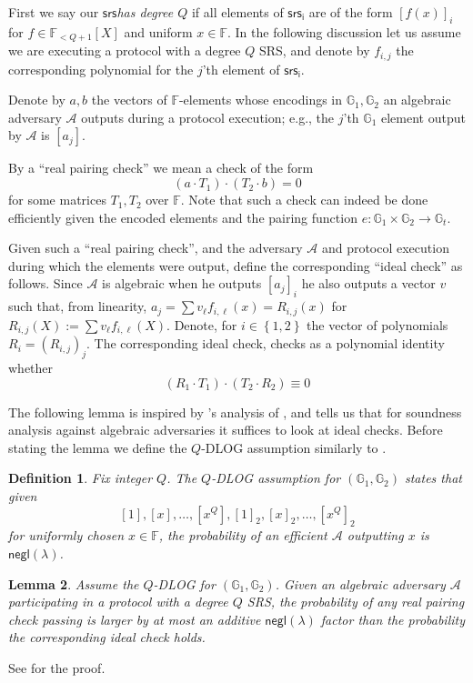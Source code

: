 \documentclass[11pt]{article} %
\newcommand{\G}{\ensuremath{{\mathbb G}}\xspace}
\newcommand{\Gt}{\ensuremath{{\mathbb G}_t}\xspace}
\newcommand{\F}{\ensuremath{\mathbb F}\xspace}
\newcommand{\adv}{\ensuremath{\mathcal A}\xspace}
\newcommand{\srs}{\ensuremath{\mathsf{srs}}\xspace}
\newcommand{\srsi}{\ensuremath{\mathsf{srs_i}}\xspace}
\newcommand{\negl}{\ensuremath{\mathsf{negl}(\lambda)}\xspace}
\newcommand{\defeq}{:=}
\newcommand{\enci}[1]{\ensuremath{\left[#1\right]_i}\xspace}
\newcommand{\enc}[1]{\ensuremath{\left[#1\right]}\xspace}
\newcommand{\enctwo}[1]{\ensuremath{\left[#1\right]_2}\xspace}
\newcommand{\set}[1]{\ensuremath{\left\{#1\right\}}\xspace}
\newcommand{\polysofdeg}[1]{\ensuremath{\F_{< #1}[X]}\xspace}
\newtheorem{lemma}{Lemma}[section]
\newtheorem{dfn}[lemma]{Definition}
\begin{document}
First we say our \srs \emph{has degree $Q$} if all elements of \srsi are of the form  \enci{f(x)} for $f\in \polysofdeg{Q+1}$ and uniform $x\in \F$. In the following discussion let us assume we are executing a protocol with a degree $Q$ SRS, and denote by $f_{i,j}$ the corresponding polynomial for the $j$'th element of \srsi.

Denote by $a,b$ the vectors of $\F$-elements whose encodings in $\G_1,\G_2$ an algebraic adversary \adv outputs during a protocol execution; e.g., the $j$'th $\G_1$ element output by \adv is \enc{a_j}.

By a ``real pairing check'' we mean a check of the form
\[(a\cdot T_1) \cdot (T_2\cdot b)=0\]
for some matrices $T_1,T_2$ over $\F$.
Note that such a check can indeed be done efficiently given the encoded elements and the pairing function $e:\G_1\times \G_2\to \Gt$.



Given such a ``real pairing check'', and the adversary \adv and protocol execution during which the elements were output, define the corresponding ``ideal check'' as follows.
Since \adv is algebraic when he outputs \enci{a_j} he also outputs a vector $v$ such that, from linearity, $a_j = \sum v_\ell f_{i,\ell}(x)=R_{i,j}(x)$ for $R_{i,j}(X) \defeq \sum v_\ell f_{i,\ell}(X)$.
Denote, for $i\in \set{1,2}$ the vector of polynomials $R_i=(R_{i,j})_j$.
The corresponding ideal check, checks as a polynomial identity whether
\[(R_1 \cdot T_1)\cdot (T_2\cdot R_2) \equiv 0\]


The following lemma is inspired by \cite{AGM}'s analysis of \cite{Groth16},
and tells us that for soundness analysis against algebraic adversaries it suffices to look at ideal checks.
Before stating the lemma we define the $Q$-DLOG assumption similarly to \cite{AGM}.
\begin{dfn}\label{ref:qdlog}
 Fix integer $Q$. The \emph{$Q$-DLOG assumption for $(\G_1,\G_2)$} states that given 
 \[\enc{1},\enc{x},\ldots,\enc{x^Q},\enctwo{1},\enctwo{x},\ldots,\enctwo{x^Q}\]
 for uniformly chosen $x\in \F$, the probability of an efficient \adv outputting $x$
 is \negl.
\end{dfn}



\begin{lemma}\label{lem:AGManalysis}
Assume the $Q$-DLOG for $(\G_1,\G_2)$.
 Given an algebraic adversary \adv participating in a protocol with a degree $Q$ SRS,
 the probability of any real pairing check passing is larger by at most an additive \negl factor than the probability the corresponding ideal check holds.
\end{lemma}
See \cite{plonk} for the proof.
\end{document}
